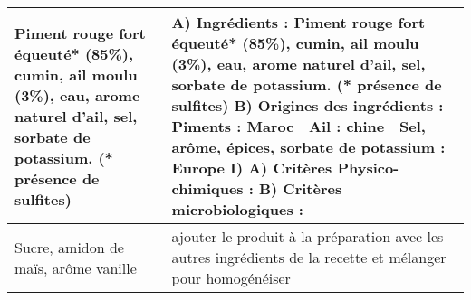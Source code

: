 \begin{longtable}{p{7cm}p{7cm}}
                                                                                                                                                                 Piment rouge fort équeuté* (85\%), cumin, ail moulu (3\%), eau, arome naturel d'ail, sel, sorbate de potassium. (* présence de sulfites) &                                                       A) Ingrédients :  \newline   \newline Piment  rouge  fort  équeuté*  (85\%),  cumin,  ail  moulu  (3\%),  eau,  arome  naturel  d’ail,  sel,  sorbate  de  \newline potassium. (* présence de sulfites)  \newline   \newline B) Origines des ingrédients :  \newline   \newline   Piments : Maroc  \newline   Ail : chine  \newline   Sel, arôme, épices, sorbate de potassium : Europe  \newline   \newline I)  \newline   \newline A) Critères Physico-chimiques :  \newline   \newline   \newline   \newline   \newline   \newline B) Critères microbiologiques :  \newline   \\ \hline
                                                                                                                                                                                                                                                                   Sucre, amidon de maïs, arôme vanille &                                                                                                                                                                                                                                                                                                                                                             ajouter le produit à la préparation avec les autres ingrédients de la recette et mélanger pour homogénéiser \\ \hline

\end{longtable}
